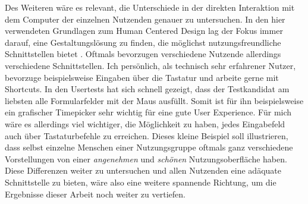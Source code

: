 Des Weiteren wäre es relevant, die Unterschiede in der direkten Interaktion mit
dem Computer der einzelnen Nutzenden genauer zu untersuchen. In den hier
verwendeten Grundlagen zum Human Centered Design lag der Fokus immer darauf,
eine Gestaltungslösung zu finden, die möglichst nutzungsfreundliche
Schnittstellen bietet \cite{hcd}. Oftmals bevorzugen verschiedene Nutzende
allerdings verschiedene Schnittstellen. Ich persönlich, als technisch sehr
erfahrener Nutzer, bevorzuge beispielsweise Eingaben über die Tastatur und
arbeite gerne mit Shortcuts. In den Usertests hat sich schnell gezeigt, dass
der Testkandidat am liebsten alle Formularfelder mit der Maus ausfüllt. Somit
ist für ihn beispielsweise ein grafischer Timepicker sehr wichtig für eine gute
User Experience. Für mich wäre es allerdings viel wichtiger, die Möglichkeit zu
haben, jedes Eingabefeld auch über Tastaturbefehle zu erreichen. Dieses kleine
Beispiel soll illustrieren, dass selbst einzelne Menschen einer Nutzungsgruppe
oftmals ganz verschiedene Vorstellungen von einer \textit{angenehmen} und
\textit{schönen} Nutzungsoberfläche haben. Diese Differenzen weiter zu
untersuchen und allen Nutzenden eine adäquate Schnittstelle zu bieten, wäre also
eine weitere spannende Richtung, um die Ergebnisse dieser Arbeit noch weiter zu
vertiefen.